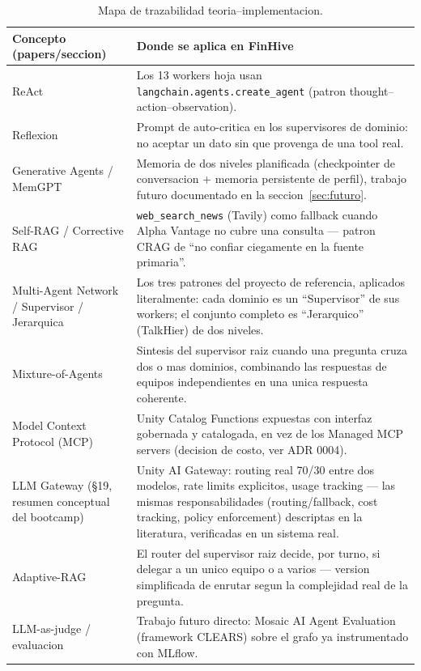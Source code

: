 \documentclass[11pt]{article}
\begin{document}
\begin{longtable}{@{}p{4.6cm}p{9.7cm}@{}}
\caption{Mapa de trazabilidad teoria--implementacion.}\label{tab:conceptos}\\
\toprule
\textbf{Concepto (papers/seccion)} & \textbf{Donde se aplica en FinHive} \\
\midrule
\endhead
ReAct \cite{yao2023} & Los 13 workers hoja usan
\texttt{langchain.agents.create\_agent} (patron thought--action--observation). \\
Reflexion \cite{shinn2023} & Prompt de auto-critica en los supervisores de
dominio: no aceptar un dato sin que provenga de una tool real. \\
Generative Agents / MemGPT \cite{park2023,packer2023} & Memoria de dos
niveles planificada (checkpointer de conversacion + memoria persistente de
perfil), trabajo futuro documentado en la seccion~\ref{sec:futuro}. \\
Self-RAG / Corrective RAG \cite{asai2024,yan2024} & \texttt{web\_search\_news}
(Tavily) como fallback cuando Alpha Vantage no cubre una consulta ---
patron CRAG de ``no confiar ciegamente en la fuente primaria''. \\
Multi-Agent Network / Supervisor / Jerarquica \cite{wu2023,wang2025} & Los
tres patrones del proyecto de referencia, aplicados literalmente: cada
dominio es un ``Supervisor'' de sus workers; el conjunto completo es
``Jerarquico'' (TalkHier) de dos niveles. \\
Mixture-of-Agents \cite{wangmoa2024} & Sintesis del supervisor raiz cuando
una pregunta cruza dos o mas dominios, combinando las respuestas de equipos
independientes en una unica respuesta coherente. \\
Model Context Protocol (MCP) & Unity Catalog Functions expuestas con
interfaz gobernada y catalogada, en vez de los Managed MCP servers
(decision de costo, ver ADR 0004). \\
LLM Gateway (\S19, resumen conceptual del bootcamp) & Unity AI Gateway:
routing real 70/30 entre dos modelos, rate limits explicitos, usage
tracking --- las mismas responsabilidades (routing/fallback, cost tracking,
policy enforcement) descriptas en la literatura, verificadas en un sistema
real. \\
Adaptive-RAG \cite{jeong2024} & El router del supervisor raiz decide, por
turno, si delegar a un unico equipo o a varios --- version simplificada de
enrutar segun la complejidad real de la pregunta. \\
LLM-as-judge / evaluacion & Trabajo futuro directo: Mosaic AI Agent
Evaluation (framework CLEARS) sobre el grafo ya instrumentado con MLflow. \\
\bottomrule
\end{longtable}
\end{document}
